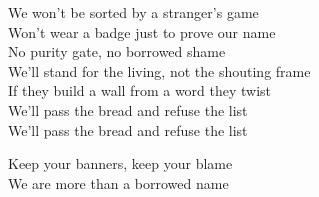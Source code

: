 \begin{lyrics}
We won't be sorted by a stranger's game\\
Won't wear a badge just to prove our name\\
No purity gate, no borrowed shame\\
We'll stand for the living, not the shouting frame\\
If they build a wall from a word they twist\\
We'll pass the bread and refuse the list\\
We'll pass the bread and refuse the list

Keep your banners, keep your blame\\
We are more than a borrowed name
\end{lyrics}

